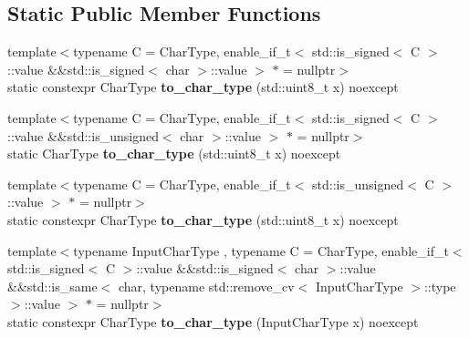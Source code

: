\subsection*{Static Public Member Functions}
\begin{DoxyCompactItemize}
\item 
\mbox{\label{classnlohmann_1_1detail_1_1binary__writer_ab77aa48692bd4e64e4f051ce6aeb6d2d}} 
{\footnotesize template$<$typename C  = Char\+Type, enable\+\_\+if\+\_\+t$<$ std\+::is\+\_\+signed$<$ C $>$\+::value \&\&std\+::is\+\_\+signed$<$ char $>$\+::value $>$ $\ast$  = nullptr$>$ }\\static constexpr Char\+Type {\bfseries to\+\_\+char\+\_\+type} (std\+::uint8\+\_\+t x) noexcept
\item 
\mbox{\label{classnlohmann_1_1detail_1_1binary__writer_a5e46f0dd3550901b15cf85265808d1ec}} 
{\footnotesize template$<$typename C  = Char\+Type, enable\+\_\+if\+\_\+t$<$ std\+::is\+\_\+signed$<$ C $>$\+::value \&\&std\+::is\+\_\+unsigned$<$ char $>$\+::value $>$ $\ast$  = nullptr$>$ }\\static Char\+Type {\bfseries to\+\_\+char\+\_\+type} (std\+::uint8\+\_\+t x) noexcept
\item 
\mbox{\label{classnlohmann_1_1detail_1_1binary__writer_ab77aa48692bd4e64e4f051ce6aeb6d2d}} 
{\footnotesize template$<$typename C  = Char\+Type, enable\+\_\+if\+\_\+t$<$ std\+::is\+\_\+unsigned$<$ C $>$\+::value $>$ $\ast$  = nullptr$>$ }\\static constexpr Char\+Type {\bfseries to\+\_\+char\+\_\+type} (std\+::uint8\+\_\+t x) noexcept
\item 
\mbox{\label{classnlohmann_1_1detail_1_1binary__writer_a2c2b2132ce56b3b45593374b622baa67}} 
{\footnotesize template$<$typename Input\+Char\+Type , typename C  = Char\+Type, enable\+\_\+if\+\_\+t$<$ std\+::is\+\_\+signed$<$ C $>$\+::value \&\&std\+::is\+\_\+signed$<$ char $>$\+::value \&\&std\+::is\+\_\+same$<$ char, typename std\+::remove\+\_\+cv$<$ Input\+Char\+Type $>$\+::type $>$\+::value $>$ $\ast$  = nullptr$>$ }\\static constexpr Char\+Type {\bfseries to\+\_\+char\+\_\+type} (Input\+Char\+Type x) noexcept
\end{DoxyCompactItemize}


